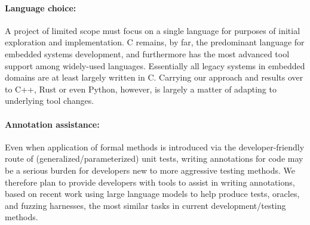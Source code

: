 \paragraph{Language choice:} A project of limited scope must focus on a single  language for purposes of initial exploration and implementation.  C remains, by far, the predominant language for embedded systems development, and furthermore has the most advanced tool support among widely-used languages.  Essentially all legacy systems in embedded domains are at least largely written in C.  Carrying our approach and results over to C++, Rust or even Python, however, is largely a matter of adapting to underlying tool changes.

\paragraph{Annotation assistance:}  Even when application of formal methods is introduced via the developer-friendly route of (generalized/parameterized) unit tests, writing annotations for code may be a serious burden for developers new to more aggressive testing methods.  We therefore plan to provide developers with tools to assist in writing annotations, based on recent work using large language models to help produce tests, oracles, and fuzzing harnesses, the most similar tasks in current development/testing methods.

